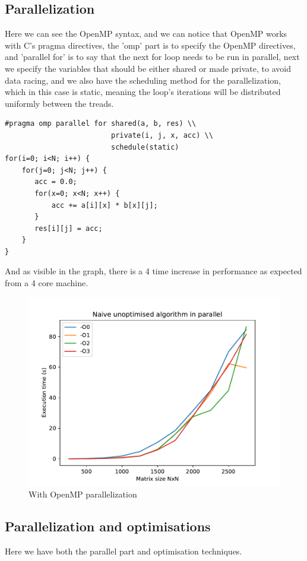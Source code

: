 \documentclass {article}
\begin{document}
\subsection{Parallelization}
Here we can see the OpenMP syntax, and we can notice that OpenMP works with C's
pragma directives, the 'omp' part is to specify the OpenMP directives, and
'parallel for' is to say that the next for loop needs to be run in parallel,
next we specify the variables that should be either shared or made private, to
avoid data racing, and we also have the scheduling method for the
parallelization, which in this case is static, meaning the loop's iterations
will be distributed uniformly between the treads.

\begin{lstlisting}
#pragma omp parallel for shared(a, b, res) \\
                         private(i, j, x, acc) \\
                         schedule(static)
for(i=0; i<N; i++) {
    for(j=0; j<N; j++) { 
       acc = 0.0;
       for(x=0; x<N; x++) {
           acc += a[i][x] * b[x][j];
       }
       res[i][j] = acc;
    }
}
\end{lstlisting}

And as visible in the graph, there is a 4 time increase in performance as
expected from a 4 core machine.
\begin{figure}[H]
    \includegraphics[width=\linewidth]{plot/parallel.pdf}
    \caption{With OpenMP parallelization}
    \label{fig:parallel}
\end{figure}

\subsection{Parallelization and optimisations}
Here we have both the parallel part and optimisation techniques.
\end{document}
